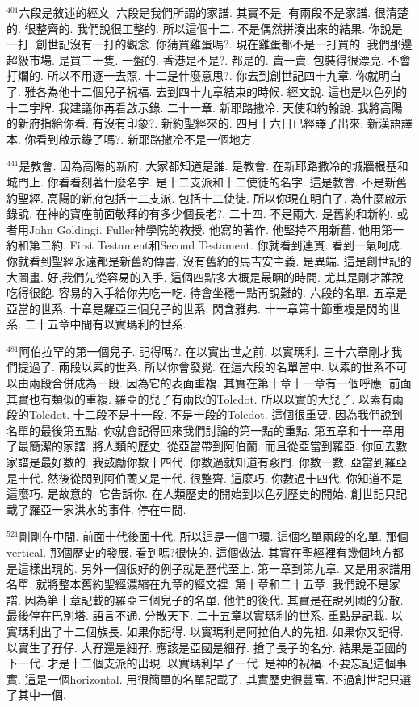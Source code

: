 \documentclass{book}
\begin{document}
$^{401}$六段是敘述的經文.
六段是我們所謂的家譜.
其實不是.
有兩段不是家譜.
很清楚的.
很整齊的.
我們說很工整的.
所以這個十二.
不是偶然拼湊出來的結果.
你說是一打.
創世記沒有一打的觀念.
你猜買雞蛋嗎?.
現在雞蛋都不是一打買的.
我們那邊超級市場.
是買三十隻.
一盤的.
香港是不是?.
都是的.
賣一賣.
包裝得很漂亮.
不會打爛的.
所以不用逐一去照.
十二是什麼意思?.
你去到創世記四十九章.
你就明白了.
雅各為他十二個兒子祝福.
去到四十九章結束的時候.
經文說.
這也是以色列的十二字牌.
我建議你再看啟示錄.
二十一章.
新耶路撒冷.
天使和約翰說.
我將高陽的新府指給你看.
有沒有印象?.
新約聖經來的.
四月十六日已經譯了出來.
新漢語譯本.
你看到啟示錄了嗎?.
新耶路撒冷不是一個地方.

$^{441}$是教會.
因為高陽的新府.
大家都知道是誰.
是教會.
在新耶路撒冷的城牆根基和城門上.
你看看刻著什麼名字.
是十二支派和十二使徒的名字.
這是教會.
不是新舊約聖經.
高陽的新府包括十二支派.
包括十二使徒.
所以你現在明白了.
為什麼啟示錄說.
在神的寶座前面敬拜的有多少個長老?.
二十四.
不是兩大.
是舊約和新約.
或者用John Goldingi.
Fuller神學院的教授.
他寫的著作.
他堅持不用新舊.
他用第一約和第二約.
First Testament和Second Testament.
你就看到連貫.
看到一氣呵成.
你就看到聖經永遠都是新舊約傳書.
沒有舊約的馬吉安主義.
是異端.
這是創世記的大圖畫.
好,我們先從容易的入手.
這個四點多大概是最睏的時間.
尤其是剛才誰說吃得很飽.
容易的入手給你先吃一吃.
待會坐穩一點再說難的.
六段的名單.
五章是亞當的世系.
十章是羅亞三個兒子的世系.
閃含雅弗.
十一章第十節重複是閃的世系.
二十五章中間有以實瑪利的世系.

$^{481}$阿伯拉罕的第一個兒子.
記得嗎?.
在以實出世之前.
以實瑪利.
三十六章剛才我們提過了.
兩段以素的世系.
所以你會發覺.
在這六段的名單當中.
以素的世系不可以由兩段合併成為一段.
因為它的表面重複.
其實在第十章十一章有一個呼應.
前面其實也有類似的重複.
羅亞的兒子有兩段的Toledot.
所以以實的大兒子.
以素有兩段的Toledot.
十二段不是十一段.
不是十段的Toledot.
這個很重要.
因為我們說到名單的最後第五點.
你就會記得回來我們討論的第一點的重點.
第五章和十一章用了最簡潔的家譜.
將人類的歷史.
從亞當帶到阿伯蘭.
而且從亞當到羅亞.
你回去數.
家譜是最好數的.
我鼓勵你數十四代.
你數過就知道有竅門.
你數一數.
亞當到羅亞是十代.
然後從閃到阿伯蘭又是十代.
很整齊.
這麼巧.
你數過十四代.
你知道不是這麼巧.
是故意的.
它告訴你.
在人類歷史的開始到以色列歷史的開始.
創世記只記載了羅亞一家洪水的事件.
停在中間.

$^{521}$剛剛在中間.
前面十代後面十代.
所以這是一個中環.
這個名單兩段的名單.
那個vertical.
那個歷史的發展.
看到嗎?很快的.
這個做法.
其實在聖經裡有幾個地方都是這樣出現的.
另外一個很好的例子就是歷代至上.
第一章到第九章.
又是用家譜用名單.
就將整本舊約聖經濃縮在九章的經文裡.
第十章和二十五章.
我們說不是家譜.
因為第十章記載的羅亞三個兒子的名單.
他們的後代.
其實是在說列國的分散.
最後停在巴別塔.
語言不通.
分散天下.
二十五章以實瑪利的世系.
重點是記載.
以實瑪利出了十二個族長.
如果你記得.
以實瑪利是阿拉伯人的先祖.
如果你又記得.
以實生了孖仔.
大孖還是細孖.
應該是亞國是細孖.
搶了長子的名分.
結果是亞國的下一代.
才是十二個支派的出現.
以實瑪利早了一代.
是神的祝福.
不要忘記這個事實.
這是一個horizontal.
用很簡單的名單記載了.
其實歷史很豐富.
不過創世記只選了其中一個.
\end{document}
